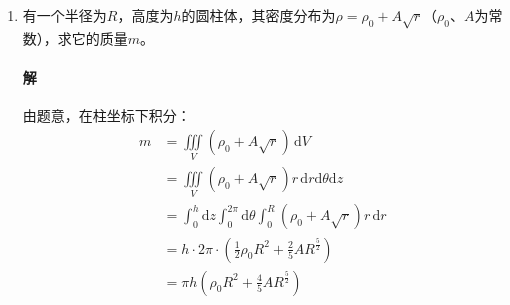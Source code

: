 \documentclass[fontset=none,openany,a4paper]{ctexbook}
\begin{document}
\begin{enumerate}
    先对$y$积分，再对$z$积分，最后对$x$积分：
    \begin{align*}
        I
        &= \iiint\mathrm{d}x\mathrm{d}z\int_0^{\ln(1+x)} 2\left[(x+z)y\mathrm{e}^y+zx\mathrm{e}^y\right]\,\mathrm{d}y \\
        &= \iiint\left\{2\left[(x+z)y\mathrm{e}^y+zx\mathrm{e}^y\right]\big|_0^{\ln(1+x)}\right\}\mathrm{d}x\mathrm{d}z \\
        &= \int \mathrm{d}x \int_0^{1-x} \{2x[x+(1+x)\ln(1+x)]+2z[x^2+x+\ln(1+x)]\}\,\mathrm{d}z \\
        &= \int\left\{2xz[x+(1+x)\ln(1+x)]+z^2[x^2+x+\ln(1+x)\big|_0^{1-x}\right\}\mathrm{d}x \\
        &= \int_0^1 \{2x(1-x)[x+(1+x)\ln(1+x)]+(1-x)^2[x^2+x+\ln(1+x)\}\,\mathrm{d}x \\
        &= \int_0^1 [(x^4-3x^3+x^2+x)-(x^3+x^2-x-1)\ln(1+x)]\,\mathrm{d}x \\
        &= \int_0^1 (x^4-3x^3+x^2+x)\,\mathrm{d}x - \int_0^1 (1+x)^3\ln(1+x)\,\mathrm{d}(1+x) + \int_0^1 2(1+x)^2\ln(1+x)\,\mathrm{d}(1+x) \\
        &= \left.\left(\frac{1}{5}x^5-\frac{3}{4}x^4+\frac{1}{3}x^3+\frac{1}{2}x^2\right)\right|_0^1 - \left.\left(\frac{1}{4}\ln(x+1)-\frac{1}{16}(x+1)^4\right)\right|_0^1 + \left.\left(\frac{2}{3}\ln(x+1)-\frac{2}{9}(x+1)^3\right)\right|_0^1 \\
        &= \frac{17}{60} - \left(4\ln2 - \frac{15}{16}\right) + \left(\frac{16}{3}\ln2 - \frac{14}{9}\right) \\
        &= -\frac{241}{720} + \frac{4}{3}\ln2
    \end{align*}

    \item 有一个半径为$R$，高度为$h$的圆柱体，其密度分布为$\rho=\rho_0+A\sqrt{r}$（$\rho_0$、$A$为常数），求它的质量$m$。

    \paragraph{解}

    由题意，在柱坐标下积分：
    \begin{align*}
        m
        &= \iiint\limits_V (\rho_0+A\sqrt{r})\,\mathrm{d}V \\
        &= \iiint\limits_V (\rho_0+A\sqrt{r})r\,\mathrm{d}r\mathrm{d}\theta\mathrm{d}z \\
        &= \int_0^h \mathrm{d}z \int_0^{2\pi} \mathrm{d}\theta \int_0^R (\rho_0+A\sqrt{r})r\,\mathrm{d}r \\
        &= h \cdot 2\pi \cdot \left(\frac{1}{2}\rho_0 R^2 + \frac{2}{5}AR^\tfrac{5}{2}\right) \\
        &= \pi h \left(\rho_0 R^2 + \frac{4}{5}AR^\tfrac{5}{2}\right)
    \end{align*}


\end{enumerate}
\end{document}
